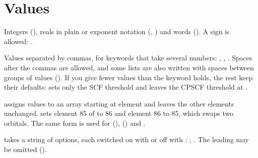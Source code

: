 \documentclass[letterpaper,10pt,english,openany,oneside]{sphinxmanual}
\begin{document}
\section{Values}
\label{\detokenize{start/input-syntax:values}}\begin{description}
\sphinxAtStartPar
Integers (), reals in plain or exponent notation (, ) and words
(). A sign is allowed: .



\sphinxAtStartPar
Values separated by commas, for keywords that take several numbers: , ,
. Spaces after the commas are allowed, and some lists are also written with spaces
between groups of values (). If you give fewer values than the keyword holds, the rest
keep their defaults:  sets only the SCF threshold and leaves the CP\sphinxhyphen{}SCF threshold at .



\sphinxAtStartPar
{} assigns values to an array starting at element  and leaves the other elements unchanged.
 sets element 85 of  to 86 and element 86 to 85, which swaps two orbitals. The same
form is used for {\hyperref[\detokenize{reference/optimize:optimize-value}]{}} (),
{\hyperref[\detokenize{reference/nmr:nmr-standard}]{}} () and {\hyperref[\detokenize{reference/atoms:atoms-core}]{}}.



\sphinxAtStartPar
{\hyperref[\detokenize{reference/control:control-print}]{}} takes a string of options, each switched on with \sphinxcode{\sphinxupquote{+}} or off with \sphinxcode{\sphinxupquote{\sphinxhyphen{}}}:
, . The leading \sphinxcode{\sphinxupquote{+}} may be omitted ().




\end{description}
\end{document}
